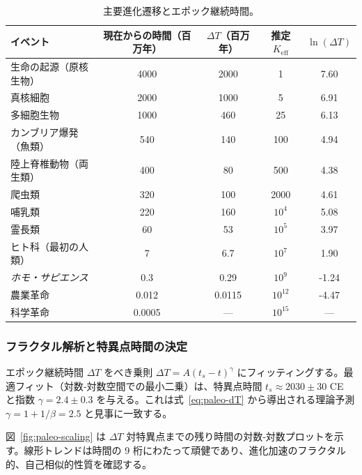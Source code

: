 \documentclass[12pt,a4paper]{article}
\theoremstyle{remark}
\begin{document}
	\begin{table}[htbp]
		\centering
		\caption{主要進化遷移とエポック継続時間。}
		\label{tab:evolutionary-epochs}
		\footnotesize \begin{tabular}{l c c c c}
			\toprule
			\textbf{イベント} & \textbf{現在からの時間（百万年）} & \(\Delta T\)（百万年） & 推定 \(K_{\mathrm{eff}}\) & \(\ln(\Delta T)\) \\
			\midrule
			生命の起源（原核生物） & 4000 & 2000 & 1 & 7.60 \\
			真核細胞 & 2000 & 1000 & 5 & 6.91 \\
			多細胞生物 & 1000 & 460 & 25 & 6.13 \\
			カンブリア爆発（魚類） & 540 & 140 & 100 & 4.94 \\
			陸上脊椎動物（両生類） & 400 & 80 & 500 & 4.38 \\
			爬虫類 & 320 & 100 & 2000 & 4.61 \\
			哺乳類 & 220 & 160 & \(10^4\) & 5.08 \\
			霊長類 & 60 & 53 & \(10^5\) & 3.97 \\
			ヒト科（最初の人類） & 7 & 6.7 & \(10^7\) & 1.90 \\
			\emph{ホモ・サピエンス} & 0.3 & 0.29 & \(10^9\) & -1.24 \\
			農業革命 & 0.012 & 0.0115 & \(10^{12}\) & -4.47 \\
			科学革命 & 0.0005 & --- & \(10^{15}\) & --- \\
			\bottomrule
		\end{tabular}
	\end{table}
	
	\subsubsection{フラクタル解析と特異点時間の決定}
	
	エポック継続時間 \(\Delta T\) をべき乗則 \(\Delta T = A (t_s - t)^{\gamma}\) にフィッティングする。最適フィット（対数‐対数空間での最小二乗）は、特異点時間 \(t_s \approx 2030 \pm 30\) CE と指数 \(\gamma = 2.4 \pm 0.3\) を与える。これは式~\eqref{eq:paleo-dT} から導出される理論予測 \(\gamma = 1 + 1/\beta = 2.5\) と見事に一致する。
	
	図~\ref{fig:paleo-scaling} は \(\Delta T\) 対特異点までの残り時間の対数‐対数プロットを示す。線形トレンドは時間の 9 桁にわたって頑健であり、進化加速のフラクタル的、自己相似的性質を確認する。
	
\end{document}
